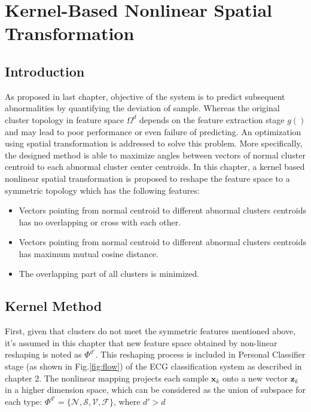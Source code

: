 \chapter{Kernel-Based Nonlinear Spatial Transformation}\label{ch:spheremapping}
\section{Introduction}

As proposed in last chapter, objective of the system is to predict subsequent abnormalities by quantifying the deviation of sample. Whereas the original cluster topology in feature space $\Omega^d$ depends on the feature extraction stage $g()$ and may lead to poor performance or even failure of predicting. An optimization using spatial transformation is addressed to solve this problem. More specifically, the designed method is able to maximize angles between vectors of normal cluster centroid to each abnormal cluster center centroids. In this chapter, a kernel based nonlinear spatial transformation is proposed to reshape the feature space to a symmetric topology which has the following features:
 \begin{itemize}
     \item Vectors pointing from normal centroid to different abnormal clusters centroids has no overlapping or cross with each other.
     \item Vectors pointing from normal centroid to different abnormal clusters centroids has maximum mutual cosine distance.
     \item The overlapping part of all clusters is minimized.
 \end{itemize}



\section{Kernel Method}

First, given that clusters do not meet the symmetric features mentioned above, it's assumed in this chapter that new feature space obtained by non-linear reshaping is noted as $\Phi^{d'}$. This reshaping process is included in Personal Classifier stage (as shown in Fig.\ref{fig:flow}) of the ECG classification system as described in chapter 2. The nonlinear mapping projects each sample $\mathbf{x}_k$   onto a new vector $\mathbf{z}_k$ in a higher dimension space, which can be considered as the union of subspace for each type: $\Phi^{d'}=\{\mathcal{N},\mathcal{S},\mathcal{V},\mathcal{F}\}$, where $d'>d$

